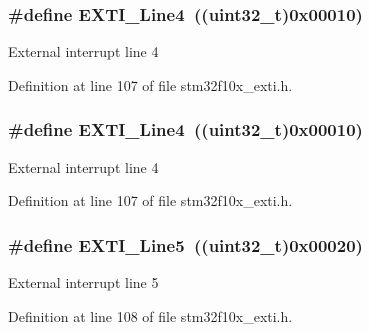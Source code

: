 \subsubsection[{\texorpdfstring{E\+X\+T\+I\+\_\+\+Line4}{EXTI_Line4}}]{\setlength{\rightskip}{0pt plus 5cm}\#define E\+X\+T\+I\+\_\+\+Line4~(({\bf uint32\+\_\+t})0x00010)}\hypertarget{group___e_x_t_i___lines_gab33b1fe19306e9e60f8f8d0928b800be}{}\label{group___e_x_t_i___lines_gab33b1fe19306e9e60f8f8d0928b800be}
External interrupt line 4 

Definition at line 107 of file stm32f10x\+\_\+exti.\+h.

\subsubsection[{\texorpdfstring{E\+X\+T\+I\+\_\+\+Line4}{EXTI_Line4}}]{\setlength{\rightskip}{0pt plus 5cm}\#define E\+X\+T\+I\+\_\+\+Line4~(({\bf uint32\+\_\+t})0x00010)}\hypertarget{group___e_x_t_i___lines_gab33b1fe19306e9e60f8f8d0928b800be}{}\label{group___e_x_t_i___lines_gab33b1fe19306e9e60f8f8d0928b800be}
External interrupt line 4 

Definition at line 107 of file stm32f10x\+\_\+exti.\+h.

\subsubsection[{\texorpdfstring{E\+X\+T\+I\+\_\+\+Line5}{EXTI_Line5}}]{\setlength{\rightskip}{0pt plus 5cm}\#define E\+X\+T\+I\+\_\+\+Line5~(({\bf uint32\+\_\+t})0x00020)}\hypertarget{group___e_x_t_i___lines_ga6b4c6292e3abd521cab2bf99d37a15c6}{}\label{group___e_x_t_i___lines_ga6b4c6292e3abd521cab2bf99d37a15c6}
External interrupt line 5 

Definition at line 108 of file stm32f10x\+\_\+exti.\+h.

